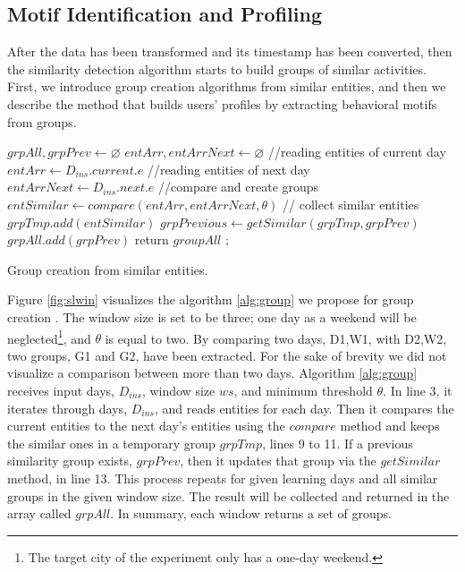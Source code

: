 \documentclass{sig-alternate}
\begin{document}
\subsection{Motif Identification and Profiling}
After the data has been transformed and its timestamp has been converted, then the similarity detection algorithm starts to build groups of similar activities. First, we introduce group creation algorithms from similar entities, and then we describe the method that builds users' profiles by extracting behavioral motifs from groups.
\begin{algorithm2e}[htb]
\scriptsize
  $grpAll , grpPrev \gets \varnothing$ \;
  $entArr , entArrNext \gets \varnothing$ \;
  { 	
	 //reading entities of current day  \\
     $entArr \gets D_{ins}.current.e $ \;
     //reading entities of next day  \;
     $entArrNext \gets D_{ins}.next.e $ \;	
	 //compare and create groups	  \;
	$entSimilar \gets compare(entArr, entArrNext, \theta)$ \;
	// collect similar entities \;
	$grpTmp.add(entSimilar)$ \;
 	 {
 		   $grpPrevious \gets getSimilar(grpTmp,grpPrev)$\;
 		   $grpAll.add(grpPrev)$ \;
 	  } 			
  } 
 return $groupAll$	;
 \caption{\footnotesize Group creation from similar entities.}\label{alg:group}
\end{algorithm2e}
\normalsize
Figure \ref{fig:slwin} visualizes the algorithm \ref{alg:group} we propose for group creation . The window size is set to be three; one day as a weekend will be neglected\footnote{\small{The target city of the experiment only has a one-day weekend.}}, and $\theta$ is equal to two. By comparing two days, D1,W1, with D2,W2, two groups, G1 and G2, have been extracted. For the sake of brevity we did not visualize a comparison between more than two days. Algorithm \ref{alg:group} receives input days, $D_{ins}$, window size $ws$, and minimum threshold $\theta$. In line 3, it iterates through days, $D_{ins}$, and reads entities for each day. Then it compares the current entities to the next day's entities using the $compare$ method and keeps the similar ones in a temporary group $grpTmp$, lines 9 to 11. If a previous similarity group exists, $grpPrev$, then it updates that group via the $getSimilar$ method, in line 13. This process repeats for given learning days and all similar groups in the given window size. The result will be collected and returned in the array called $grpAll$. In summary, each window returns a set of groups.\\
\end{document}
